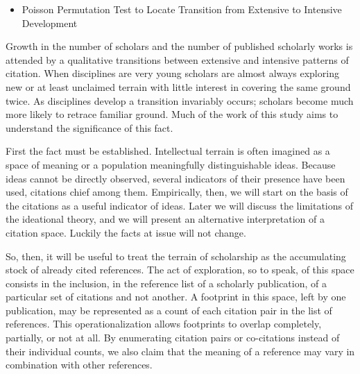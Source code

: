 \begin{itemize}
\tightlist
\item
  Poisson Permutation Test to Locate Transition from Extensive to
  Intensive Development
\end{itemize}

Growth in the number of scholars and the number of published scholarly
works is attended by a qualitative transitions between extensive and
intensive patterns of citation. When disciplines are very young scholars
are almost always exploring new or at least unclaimed terrain with
little interest in covering the same ground twice. As disciplines
develop a transition invariably occurs; scholars become much more likely
to retrace familiar ground. Much of the work of this study aims to
understand the significance of this fact.

First the fact must be established. Intellectual terrain is often
imagined as a space of meaning or a population meaningfully
distinguishable ideas. Because ideas cannot be directly observed,
several indicators of their presence have been used, citations chief
among them. Empirically, then, we will start on the basis of the
citations as a useful indicator of ideas. Later we will discuss the
limitations of the ideational theory, and we will present an alternative
interpretation of a citation space. Luckily the facts at issue will not
change.

So, then, it will be useful to treat the terrain of scholarship as the
accumulating stock of already cited references. The act of exploration,
so to speak, of this space consists in the inclusion, in the reference
list of a scholarly publication, of a particular set of citations and
not another. A footprint in this space, left by one publication, may be
represented as a count of each citation pair in the list of references.
This operationalization allows footprints to overlap completely,
partially, or not at all. By enumerating citation pairs or co-citations
instead of their individual counts, we also claim that the meaning of a
reference may vary in combination with other references.

